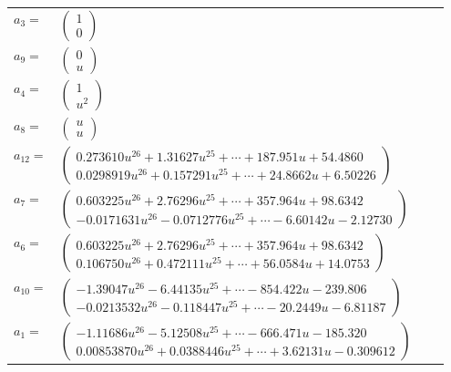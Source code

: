 \documentclass[1p]{elsarticle_modified}
\theoremstyle{definition}
\begin{document}
\begin{tabular}{m{7pt} m{180pt} m{7pt} m{180pt} }
\flushright $a_{3}=$&$\begin{pmatrix}1\\0\end{pmatrix}$ \\
\flushright $a_{9}=$&$\begin{pmatrix}0\\u\end{pmatrix}$ \\
\flushright $a_{4}=$&$\begin{pmatrix}1\\u^2\end{pmatrix}$ \\
\flushright $a_{8}=$&$\begin{pmatrix}u\\u\end{pmatrix}$ \\
\flushright $a_{12}=$&$\begin{pmatrix}0.273610 u^{26}+1.31627 u^{25}+\cdots+187.951 u+54.4860\\0.0298919 u^{26}+0.157291 u^{25}+\cdots+24.8662 u+6.50226\end{pmatrix}$ \\
\flushright $a_{7}=$&$\begin{pmatrix}0.603225 u^{26}+2.76296 u^{25}+\cdots+357.964 u+98.6342\\-0.0171631 u^{26}-0.0712776 u^{25}+\cdots-6.60142 u-2.12730\end{pmatrix}$ \\
\flushright $a_{6}=$&$\begin{pmatrix}0.603225 u^{26}+2.76296 u^{25}+\cdots+357.964 u+98.6342\\0.106750 u^{26}+0.472111 u^{25}+\cdots+56.0584 u+14.0753\end{pmatrix}$ \\
\flushright $a_{10}=$&$\begin{pmatrix}-1.39047 u^{26}-6.44135 u^{25}+\cdots-854.422 u-239.806\\-0.0213532 u^{26}-0.118447 u^{25}+\cdots-20.2449 u-6.81187\end{pmatrix}$ \\
\flushright $a_{1}=$&$\begin{pmatrix}-1.11686 u^{26}-5.12508 u^{25}+\cdots-666.471 u-185.320\\0.00853870 u^{26}+0.0388446 u^{25}+\cdots+3.62131 u-0.309612\end{pmatrix}$ \\

\end{tabular}
\end{document}
